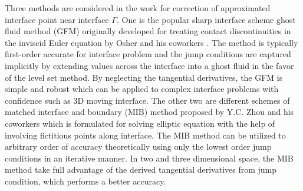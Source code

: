 \documentclass[dissertation]{uathesis}
\begin{document}
\begin{body}
\begin{flushleft}
\hspace{1cm} Three methods are considered in the work for correction of approximated interface point near interface $\Gamma$. One is the popular sharp interface scheme ghost fluid method (GFM) originally developed for treating contact discontinuities in the inviscid Euler equation by Osher and his coworkers \cite{fedkiw1999non}. The method is typically first-order accurate for interface problem and the jump conditions are captured implicitly by extending values across the interface into a ghost fluid in the favor of the level set method. By neglecting the tangential derivatives, the GFM is simple and robust which can be applied to complex interface problems  with confidence such as 3D moving interface. The other two are different schemes of matched interface and boundary (MIB) method proposed by Y.C. Zhou and his coworkers \cite{zhou2006high} which is formulated for solving elliptic equation with the help of involving fictitious points along interface. The MIB method can be utilized to arbitrary order of accuracy theoretically using only the lowest order jump conditions in an iterative manner. In two and three dimensional space, the MIB method take full advantage of the derived tangential derivatives from jump condition, which performs a better accuracy.
%
\begin{figure}[!ht]
	\begin{center}
\end{center}
\end{figure}
\end{flushleft}
\end{body}
\end{document}
